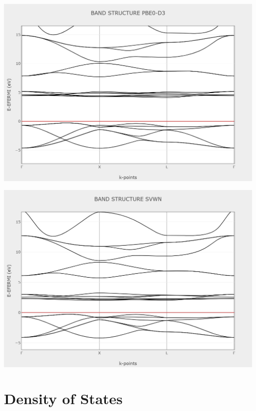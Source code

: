 \documentclass{article}
\begin{document}
\noindent\begin{minipage}{0.45\textwidth}
	\centering
	\includegraphics[width=1\textwidth]{../images/BANDS/BAND_STRUCTURE_PBE0D3.jpeg}
    \label{fig:bands_PBE0D3}
\end{minipage}
\hfill
\begin{minipage}{0.45\textwidth}
	\centering
	\includegraphics[width=1\textwidth]{../images/BANDS/BAND_STRUCTURE_SVWN.jpeg}
    \label{fig:bands_SVWN}
\end{minipage}

\newpage
\section{Density of States}
\end{document}
